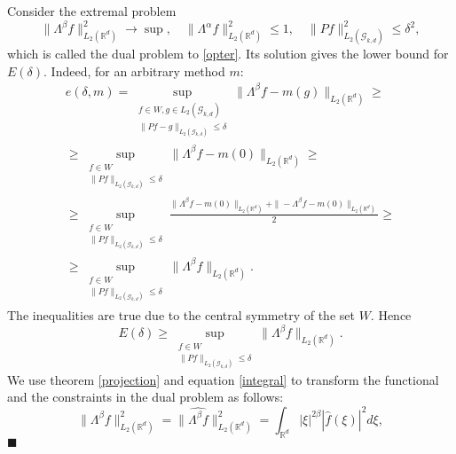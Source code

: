\documentclass[12pt]{iopart}
\newenvironment{proof}
{\par\noindent{\bf Proof}}
{\hfill$\scriptstyle\blacksquare$}
\begin{document}
	\begin{proof}
		Consider the extremal problem
		\[
		\|\Lambda^\beta f\|^2_{L_2(\mathbb R^d)}\to\sup,\quad \|
		\Lambda^\alpha f\|^2_{L_2(\mathbb R^d)}\leqslant  1,\quad
		\|Pf\|^2_{L_2(\mathcal G_{k,d})}\leqslant  \delta^2,
		\] which is called the dual problem to \eqref{opter}.
		Its solution gives the lower bound for $E(\delta)$. Indeed, for an arbitrary method $m$:
		\begin{multline*}
		e(\delta,m)= \sup_{
			\begin{smallmatrix}
			f\in W, g\in L_2(\mathcal G_{k,d})\\ 
			\|Pf-g\|_{L_2(\mathcal G_{k,d})}\leqslant \delta
			\end{smallmatrix}}
		\|\Lambda^\beta f-m(g)\|_{L_2(\mathbb{R}^d)}\geqslant\\
		\geqslant\sup_{
			\begin{smallmatrix}
			f\in W\\ 
			\|Pf\|_{L_2(\mathcal G_{k,d})}\leqslant \delta
			\end{smallmatrix}}
		\|\Lambda^\beta f-m(0)\|_{L_2(\mathbb{R}^d)}\geqslant \\
		\geqslant \sup_{
			\begin{smallmatrix}
			f\in W\\ 
			\|Pf\|_{L_2(\mathcal G_{k,d})}\leqslant \delta
			\end{smallmatrix}}
		\frac{\|\Lambda^\beta f-m(0)\|_{L_2(\mathbb{R}^d)}+\|-\Lambda^\beta f-m(0)\|_{L_2(\mathbb{R}^d)}}{2}\geqslant \\
		\geqslant\sup_{
			\begin{smallmatrix}
			f\in W\\ 
			\|Pf\|_{L_2(\mathcal G_{k,d})}\leqslant \delta
			\end{smallmatrix}}
		\|\Lambda^\beta f\|_{L_2(\mathbb{R}^d)}.
		\end{multline*}
		The inequalities are true due to the central symmetry of the set $W$. Hence
		$$E(\delta)\geqslant\sup_{
			\begin{smallmatrix}
			f\in W\\ 
			\|Pf\|_{L_2(\mathcal G_{k,d})}\leqslant \delta
			\end{smallmatrix}}
		\|\Lambda^\beta f\|_{L_2(\mathbb{R}^d)}.$$
		We use theorem \ref{projection} and equation \eqref{integral} to transform the functional and the constraints in the dual problem as follows: 
		\[
		\|\Lambda^\beta f\|^2_{L_2(\mathbb R^d)}=\|\widehat{\Lambda^\beta f}\|^2_{L_2(\mathbb R^d)}=\int_{\mathbb R^d}|\xi|^{2\beta}|\widehat{f}(\xi )|^2d\xi,
\]
\end{proof}
\end{document}
